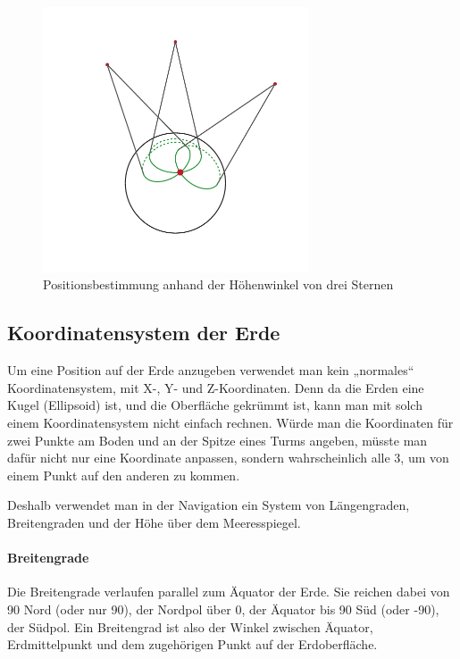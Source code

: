 \documentclass[12pt,a4paper]{scrartcl}
\begin{document}
\begin{figure}[H]
\centering
\includegraphics[width=0.7\textwidth]{img/earth_cones.pdf}
\caption{Positionsbestimmung anhand der Höhenwinkel von drei Sternen}
\end{figure}

\subsection{Koordinatensystem der Erde}
Um eine Position auf der Erde anzugeben verwendet man kein „normales“ Koordinatensystem, mit X-, Y- und Z-Koordinaten. Denn da die Erden eine Kugel (Ellipsoid) ist, und die Oberfläche gekrümmt ist, kann man mit solch einem Koordinatensystem nicht einfach rechnen. Würde man die Koordinaten für zwei Punkte am Boden und an der Spitze eines Turms angeben, müsste man dafür nicht nur eine Koordinate anpassen, sondern wahrscheinlich alle 3, um von einem Punkt auf den anderen zu kommen.

Deshalb verwendet man in der Navigation ein System von Längengraden, Breitengraden und der Höhe über dem Meeresspiegel.

\paragraph{Breitengrade} Die Breitengrade verlaufen parallel zum Äquator der Erde. Sie reichen dabei von 90\degree{} Nord (oder nur 90\degree), der Nordpol über 0\degree, der Äquator bis 90\degree{} Süd (oder -90\degree), der Südpol. Ein Breitengrad ist also der Winkel zwischen Äquator, Erdmittelpunkt und dem zugehörigen Punkt auf der Erdoberfläche.
\end{document}
